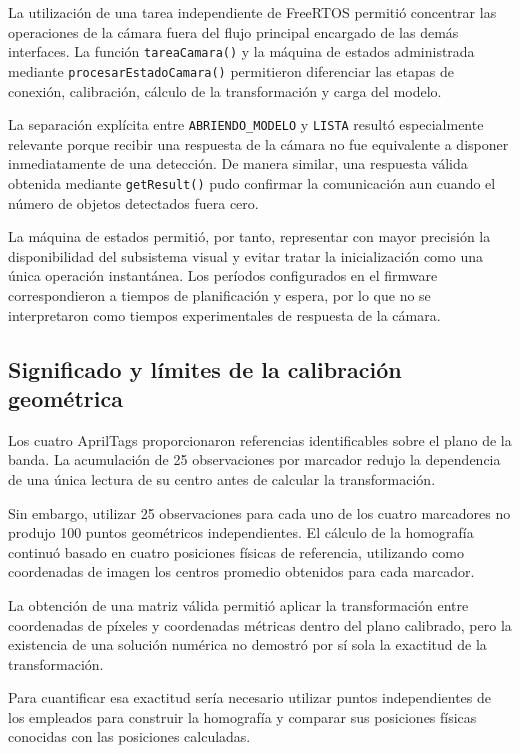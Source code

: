 La utilización de una tarea independiente de FreeRTOS permitió concentrar las operaciones de la cámara fuera del flujo principal encargado de las demás interfaces. La función \texttt{tareaCamara()} y la máquina de estados administrada mediante \texttt{procesarEstadoCamara()} permitieron diferenciar las etapas de conexión, calibración, cálculo de la transformación y carga del modelo.

La separación explícita entre \texttt{ABRIENDO\_MODELO} y \texttt{LISTA} resultó especialmente relevante porque recibir una respuesta de la cámara no fue equivalente a disponer inmediatamente de una detección. De manera similar, una respuesta válida obtenida mediante \texttt{getResult()} pudo confirmar la comunicación aun cuando el número de objetos detectados fuera cero.

La máquina de estados permitió, por tanto, representar con mayor precisión la disponibilidad del subsistema visual y evitar tratar la inicialización como una única operación instantánea. Los períodos configurados en el firmware correspondieron a tiempos de planificación y espera, por lo que no se interpretaron como tiempos experimentales de respuesta de la cámara.


\subsection{Significado y límites de la calibración geométrica}

Los cuatro AprilTags proporcionaron referencias identificables sobre el plano de la banda. La acumulación de 25 observaciones por marcador redujo la dependencia de una única lectura de su centro antes de calcular la transformación.

Sin embargo, utilizar 25 observaciones para cada uno de los cuatro marcadores no produjo 100 puntos geométricos independientes. El cálculo de la homografía continuó basado en cuatro posiciones físicas de referencia, utilizando como coordenadas de imagen los centros promedio obtenidos para cada marcador.

La obtención de una matriz válida permitió aplicar la transformación entre coordenadas de píxeles y coordenadas métricas dentro del plano calibrado, pero la existencia de una solución numérica no demostró por sí sola la exactitud de la transformación.

Para cuantificar esa exactitud sería necesario utilizar puntos independientes de los empleados para construir la homografía y comparar sus posiciones físicas conocidas con las posiciones calculadas.

